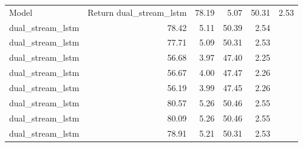 \begin{tabular}{lrrrr}
\toprule
Model & Return %
\midrule
dual_stream_lstm & 78.19 & 5.07 & 50.31 & 2.53 \\
dual_stream_lstm & 78.42 & 5.11 & 50.39 & 2.54 \\
dual_stream_lstm & 77.71 & 5.09 & 50.31 & 2.53 \\
dual_stream_lstm & 56.68 & 3.97 & 47.40 & 2.25 \\
dual_stream_lstm & 56.67 & 4.00 & 47.47 & 2.26 \\
dual_stream_lstm & 56.19 & 3.99 & 47.45 & 2.26 \\
dual_stream_lstm & 80.57 & 5.26 & 50.46 & 2.55 \\
dual_stream_lstm & 80.09 & 5.26 & 50.46 & 2.55 \\
dual_stream_lstm & 78.91 & 5.21 & 50.31 & 2.53 \\
\bottomrule
\end{tabular}

